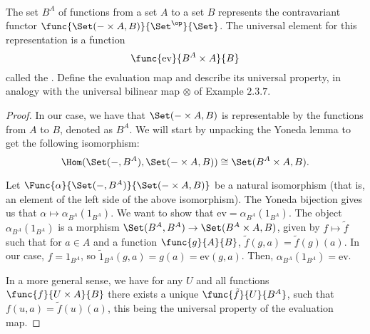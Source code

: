 \documentclass[../../main]{subfiles}
\begin{document}
\paragraph{}
\begin{exercise}
	The set $B^A$ of functions from a set $A$ to a set $B$ represents the
	contravariant functor $\func{\Set(-\times A, B)}{\Set^\op}{\Set}$. The
	universal element for this representation is a function
	$$\func{\text{ev}}{B^A\times A}{B}$$
	called the . Define the evaluation map and describe its universal property, in analogy with the universal bilinear map $\otimes$ of Example $2.3.7$.
\end{exercise}

\begin{proof}
	In our case, we have that $\Set(-\times A, B)$ is representable by the
	functions from $A$ to $B$, denoted as $B^A$. We will start by unpacking the Yoneda lemma to get the following isomorphism:
	$$
	\Hom(\Set(-,B^A), \Set(-\times A, B))\cong \Set(B^A\times A, B).
	$$

	Let $\Func{\alpha}{\Set(-,B^A)}{\Set(-\times A, B)}$ be a natural
	isomorphism (that is, an element of the left side of the above
	isomorphism). The Yoneda bijection gives us that $\alpha\mapsto
	\alpha_{B^A}(1_{B^A})$. We want to show that $\text{ev} =
	\alpha_{B^A}(1_{B^A})$. The object $\alpha_{B^A}(1_{B^A})$ is a morphism
	$\Set(B^A, B^A)\rightarrow \Set(B^A\times A, B)$, given by $f \mapsto
	\tilde{f}$ such that for $a\in A$ and a function $\func{g}{A}{B}$,
	$\tilde{f}(g,a) = \tilde{f}(g)(a)$. In our case, $f=1_{B^A}$, so
	$\tilde{1}_{B^A}(g,a) = g(a) = \text{ev}(g,a)$. Then,
	$\alpha_{B^A}(1_{B^A}) = \text{ev}$.

	In a more general sense, we have for any $U$ and all functions
	$\func{f}{U\times A}{B}$ there exists a unique $\func{\tilde{f}}{U}{B^A}$,
	such that $f(u,a) = \tilde{f}(u)(a)$, this being the universal property of
	the evaluation map.
\end{proof}
\end{document}
